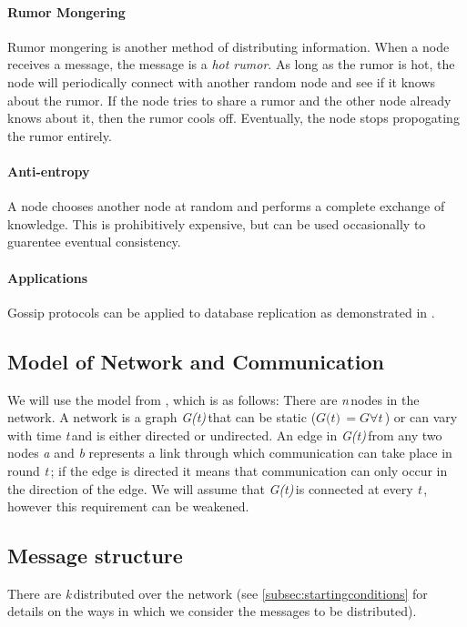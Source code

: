 \documentclass{article} %
\def\numNodes{\textit{n}\,}
\def\graph{\textit{G(t)}\,}
\def\graphtime{\textit{t}\,}
\def\numMessages{\textit{k}\,}
\begin{document}
\paragraph{Rumor Mongering}
Rumor mongering is another method of distributing information. When a node receives a message, the message is a \textit{hot rumor}. As long as the rumor is hot, the node will periodically connect with another random node and see if it knows about the rumor. If the node tries to share a rumor and the other node already knows about it, then the rumor cools off. Eventually, the node stops propogating the rumor entirely. 

\paragraph{Anti-entropy}
A node chooses another node at random and performs a complete exchange of knowledge. This is prohibitively expensive, but can be used occasionally to guarentee eventual consistency.

\paragraph{Applications}
Gossip protocols can be applied to database replication as demonstrated in \cite{demers1987epidemic}. 

\subsection{Model of Network and Communication}
We will use the model from \cite{haeupler2011analyzing}, which is as follows: There are \numNodes nodes in the network. A network is a graph \graph that can be static ($\graph = G  \forall \graphtime$) or can vary with time \graphtime and is either directed or undirected. An edge in \graph from any two nodes \textit{a} and \textit{b} represents a link through which communication can take place in round \graphtime; if the edge is directed it means that communication can only occur in the direction of the edge. We will assume that \graph is connected at every \graphtime, however this requirement can be weakened. 

\subsection{Message structure}
There are \numMessages distributed over the network (see \ref{subsec:startingconditions} for details on the ways in which we consider the messages to be distributed). 
\end{document}
